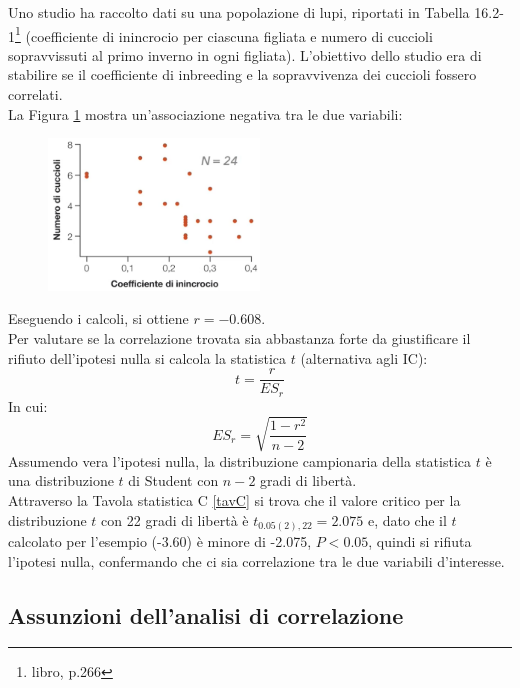 \documentclass[10pt, draft]{book}
\newcounter{example}[section]
\begin{document}
\begin{example}\label{esinbreeding}
    Uno studio ha raccolto dati su una popolazione di lupi, riportati in Tabella 16.2-1\footnote{libro, p.266} (coefficiente di inincrocio per ciascuna figliata e numero di cuccioli sopravvissuti al primo inverno in ogni figliata). L'obiettivo dello studio era di stabilire se il coefficiente di inbreeding e la sopravvivenza dei cuccioli fossero correlati.\\
    La Figura \ref{fig16.2-1} mostra un'associazione negativa tra le due variabili:
    \begin{figure}[H]
        \centering
        \includegraphics[width=0.5\textwidth]{fig16.2-1}
        \caption{\small{}}
        \label{fig16.2-1}
    \end{figure}
    Eseguendo i calcoli, si ottiene $r = -0.608$.\\
    Per valutare se la correlazione trovata sia abbastanza forte da giustificare il rifiuto dell'ipotesi nulla si calcola la statistica $t$ (alternativa agli IC):
    \begin{equation}
        t = \frac{r}{ES_r}
    \end{equation}
    In cui:
    \begin{equation}
        ES_r = \sqrt{\frac{1-r^2}{n-2}}
    \end{equation}
    Assumendo vera l'ipotesi nulla, la distribuzione campionaria della statistica $t$ è una distribuzione $t$ di Student con $n-2$ gradi di libertà.\\
    Attraverso la Tavola statistica C \ref{tavC} si trova che il valore critico per la distribuzione $t$ con 22 gradi di libertà è $t_{0.05(2),22} = 2.075$ e, dato che il $t$ calcolato per l'esempio (-3.60) è minore di -2.075, $P<0.05$, quindi si rifiuta l'ipotesi nulla, confermando che ci sia correlazione tra le due variabili d'interesse.
\end{example}

\subsection{Assunzioni dell'analisi di correlazione}
\end{document}
